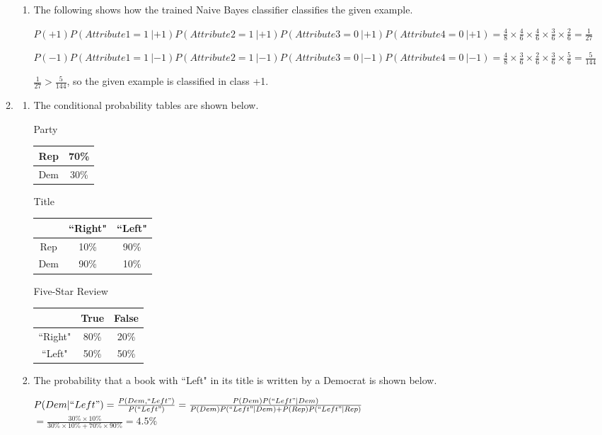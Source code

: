 \documentclass[11pt,letterpaper,oneside]{article}
\begin{document}
\begin{enumerate}
\begin{enumerate}
\begin{enumerate}
    \item The following shows how the trained Naive Bayes classifier classifies the given example.

$P(+1)P(Attribute1=1\ | +1)P(Attribute2=1\ | +1)P(Attribute3=0\ | +1)P(Attribute4=0\ | +1) = \frac{4}{8} \times \frac{4}{6} \times \frac{4}{6} \times \frac{3}{6} \times \frac{2}{6} = \frac{1}{27}$

$P(-1)P(Attribute1=1\ | -1)P(Attribute2=1\ | -1)P(Attribute3=0\ | -1)P(Attribute4=0\ | -1) = \frac{4}{8} \times \frac{3}{6} \times \frac{2}{6} \times \frac{3}{6} \times \frac{5}{6} = \frac{5}{144}$

$\frac{1}{27} > \frac{5}{144}$, so the given example is classified in class +1.
    \end{enumerate}

  \item 
    \begin{enumerate}
    \item The conditional probability tables are shown below.

  Party
  \begin{tabular}{|c|c|}
     \hline
     Rep& 70\%\\
     \hline
     Dem& 30\%\\
     \hline
  \end{tabular}

  Title
  \begin{tabular}{|c|c|c|}
     \hline
     & ``Right" & ``Left"\\
     \hline
     Rep& 10\% & 90\%\\
     \hline
     Dem& 90\% & 10\%\\
     \hline
  \end{tabular}

  Five-Star Review
  \begin{tabular}{|c|c|c|}
     \hline
     & True & False\\
     \hline
     ``Right"& 80\% & 20\%\\
     \hline
     ``Left"& 50\% & 50\%\\
     \hline
  \end{tabular}


    \item The probability that a book with ``Left" in its title is written by a Democrat is shown below.

$P(Dem | ``Left") = \frac{P(Dem, ``Left")}{P(``Left")} = \frac{P(Dem)P(``Left" | Dem)}{P(Dem)P(``Left" | Dem) + P(Rep)P(``Left" | Rep)}$\\$= \frac{30\% \times 10\%}{30\% \times 10\% + 70\% \times 90\%} = 4.5\%$


\end{enumerate}
\end{enumerate}
\end{enumerate}
\end{document}
